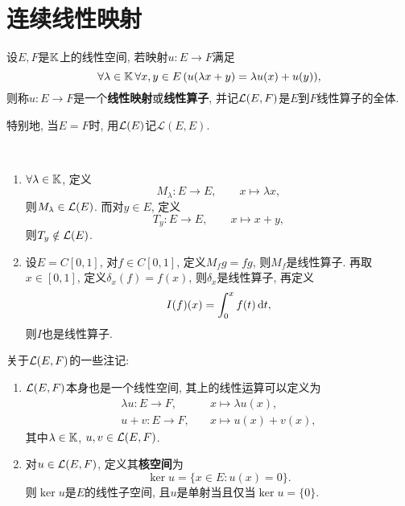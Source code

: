 \section{连续线性映射}

\begin{Definition}
	设$ E, F $是$ \mathbb{K} $上的线性空间, 若映射$ u : E\to F $满足
	\[
		\forall \lambda\in\mathbb{K}\,\forall x,y\in E\,(u(\lambda x+y)=\lambda u(x)+u(y)),
	\]
	则称$ u : E\to F $是一个\textbf{线性映射}或\textbf{线性算子}, 并记$ \mathcal{L}(E,F) $是$ E $到$ F $线性算子的全体.
\end{Definition}

特别地, 当$ E=F $时, 用$ \mathcal{L}(E) $记$ \mathcal{L}(E,E) $.

\begin{Example}~
	\begin{enumerate}[(1)]
		\item $ \forall \lambda\in\mathbb{K} $, 定义
		      \[
			      M_\lambda : E\to E,\qquad x\mapsto\lambda x,
		      \]
		      则$ M_\lambda\in\mathcal{L}(E) $. 而对$ y\in E $, 定义
		      \[
			      T_y : E\to E,\qquad x\mapsto x+y,
		      \]
		      则$ T_y\notin\mathcal{L}(E) $.

		\item 设$ E=C[0,1] $, 对$ f\in C[0,1] $, 定义$ M_fg=fg $, 则$ M_f $是线性算子. 再取$ x\in[0,1] $, 定义$ \delta_x(f)=f(x) $, 则$ \delta_x $是线性算子, 再定义
		      \[
			      I(f)(x)=\int_0^xf(t)\,\mathrm{d} t,
		      \]
		      则$ I $也是线性算子.
	\end{enumerate}
\end{Example}

\begin{Remark}
	关于$ \mathcal{L}(E,F) $的一些注记:
	\begin{enumerate}[(1)]
		\item $ \mathcal{L}(E,F) $本身也是一个线性空间, 其上的线性运算可以定义为
		      \[
			      \begin{aligned}
				      \lambda u : E\to F, & \quad x\mapsto\lambda u(x), \\
				      u+v : E\to F,       & \quad x\mapsto u(x)+v(x),
			      \end{aligned}
		      \]
		      其中$ \lambda\in\mathbb{K} $, $ u, v\in\mathcal{L}(E,F) $.

		\item 对$ u\in\mathcal{L}(E,F) $, 定义其\textbf{核空间}为
		      \[
			      \ker u=\{ x\in E : u(x)=0 \}.
		      \]
		      则$ \ker u $是$ E $的线性子空间, 且$ u $是单射当且仅当$ \ker u=\{0\} $.
	\end{enumerate}
\end{Remark}

